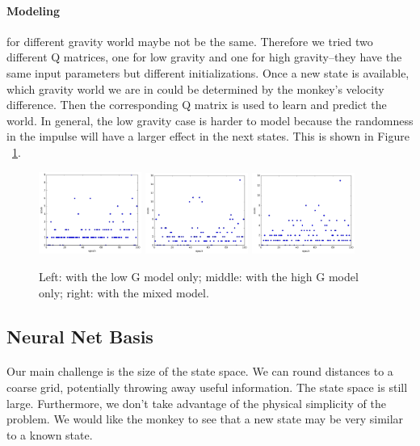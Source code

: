 \documentclass[11pt]{article}
\begin{document}
\paragraph{Modeling} for different gravity world maybe not be the same. Therefore we tried two different Q matrices, one for low gravity and one for high gravity--they have the same input parameters but different initializations. Once a new state is available, which gravity world we are in could be determined by the monkey's velocity difference. Then the corresponding Q matrix is used to learn and predict the world. In general, the low gravity case is harder to model because the randomness in the impulse will have a larger effect in the next states. This is shown in Figure ~\ref{QModel}.
\begin{figure}[] 
\centering
        \includegraphics[width=0.3\textwidth]{Plot/learn_lowonly2.png}
        \includegraphics[width=0.3\textwidth]{Plot/learn_highonly2.png}
        \includegraphics[width=0.3\textwidth]{Plot/learn_mix.png}
        \caption{Left: with the low G model only; middle: with the high G model only; right: with the mixed model.}
            \label{QModel}
\end{figure}
\subsection{Neural Net Basis}
\paragraph{}Our main challenge is the size of the state space. We can round distances to a coarse grid, potentially throwing away useful information. The state space is still large. Furthermore, we don't take advantage of the physical simplicity of the problem. We would like the monkey to see that a new state may be very similar to a known state.
\end{document}
